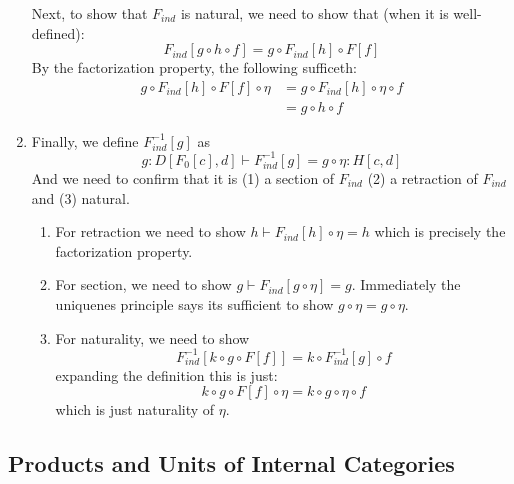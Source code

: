 \documentclass{article}
\begin{document}
\begin{construction}
\begin{enumerate}
    Next, to show that $F_{ind}$ is natural, we need to show that
    (when it is well-defined):
    \[F_{ind}[g \circ h \circ f] = g \circ F_{ind}[h] \circ F[f] \]
    By the factorization property, the following sufficeth:
    \begin{align*}
     g \circ F_{ind}[h] \circ F[f] \circ \eta
     &= g \circ F_{ind}[h] \circ \eta \circ f \tag{naturality of $\eta$}\\
     &= g \circ h \circ f \tag{factorization}
    \end{align*}
  \item Finally, we define $F_{ind}^{-1}[g]$ as
    \[ g : D[F_0[c],d] \vdash F_{ind}^{-1}[g] = g \circ \eta : H[c,d] \]
    And we need to confirm that it is (1) a section of $F_{ind}$ (2) a
    retraction of $F_{ind}$ and (3) natural.
    \begin{enumerate}
    \item For retraction we need to show $h \vdash F_{ind}[h] \circ
      \eta = h$ which is precisely the factorization property.
    \item For section, we need to show $g \vdash F_{ind}[g \circ \eta]
      = g$. Immediately the uniquenes principle says its sufficient to
      show $g \circ \eta = g \circ \eta$.
    \item For naturality, we need to show
      \[ F_{ind}^{-1}[k \circ g \circ F[f]] = k \circ F_{ind}^{-1}[g] \circ f \]
      expanding the definition this is just:
      \[ k \circ g \circ F[f] \circ \eta = k \circ g \circ \eta \circ f \]
      which is just naturality of $\eta$.
    \end{enumerate}
  \end{enumerate}
\end{construction}

\subsection{Products and Units of Internal Categories}


\end{document}
